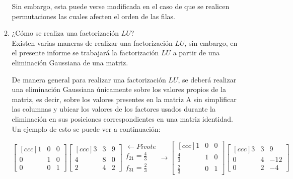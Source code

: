 \documentclass[english,notitlepage,letterpaper, 10pt]{article} %
\begin{document}
\begin{enumerate}
\begin{enumerate}
                Sin embargo, esta puede verse modificada en el caso de que se realicen permutaciones las cuales afecten el orden de las filas.

          \item ¿Cómo se realiza una factorización $LU$? \\
                Existen varias maneras de realizar una factorización $LU$, sin embargo, en el presente informe se trabajará la factorización $LU$ a partir de una eliminación Gaussiana de una matriz.

                De manera general para realizar una factorización $LU$, se deberá realizar una eliminación Gaussiana únicamente sobre los valores propios de la matriz, es decir, sobre los valores presentes en la matriz A sin simplificar las columnas y ubicar los valores de los factores usados durante la eliminación en sus posiciones correspondientes en una matriz identidad. Un ejemplo de esto se puede ver a continuación:

                \begin{displaymath}
                  \begin{bmatrix}[ccc]
                    1 & 0 & 0 \\
                    0 & 1 & 0 \\
                    0 & 0 & 1
                  \end{bmatrix}
                  \begin{bmatrix}[ccc]
                    3 & 3 & 9 \\
                    4 & 8 & 0 \\
                    2 & 4 & 2
                  \end{bmatrix}
                  \begin{matrix}
                    \leftarrow Pivote  \\
                    f_{21}=\frac{4}{3} \\
                    f_{31}=\frac{2}{3}
                  \end{matrix}
                  \longrightarrow
                  \begin{bmatrix}[ccc]
                    1           & 0 & 0 \\
                    \frac{4}{3} & 1 & 0 \\
                    \frac{2}{3} & 0 & 1
                  \end{bmatrix}
                  \begin{bmatrix}[ccc]
                    3 & 3 & 9   \\
                    0 & 4 & -12 \\
                    0 & 2 & -4
                  \end{bmatrix}
                \end{displaymath}


\end{enumerate}
\end{enumerate}
\end{document}
